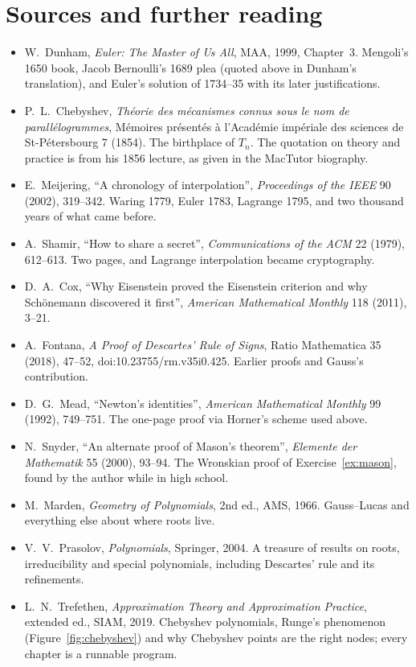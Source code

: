 \section*{Sources and further reading}

\begin{itemize}\raggedright
\item W.~Dunham, \emph{Euler: The Master of Us All}, MAA, 1999, Chapter~3. Mengoli's 1650 book, Jacob Bernoulli's 1689 plea (quoted above in Dunham's translation), and Euler's solution of 1734--35 with its later justifications.
\item P.~L.~Chebyshev, \emph{Th\'eorie des m\'ecanismes connus sous le nom de parall\'elogrammes}, M\'emoires pr\'esent\'es \`a l'Acad\'emie imp\'eriale des sciences de St-P\'etersbourg 7 (1854). The birthplace of $T_n$. The quotation on theory and practice is from his 1856 lecture, as given in the MacTutor biography.
\item E.~Meijering, ``A chronology of interpolation'', \emph{Proceedings of the IEEE} 90 (2002), 319--342. Waring 1779, Euler 1783, Lagrange 1795, and two thousand years of what came before.
\item A.~Shamir, ``How to share a secret'', \emph{Communications of the ACM} 22 (1979), 612--613. Two pages, and Lagrange interpolation became cryptography.
\item D.~A.~Cox, ``Why Eisenstein proved the Eisenstein criterion and why Sch\"onemann discovered it first'', \emph{American Mathematical Monthly} 118 (2011), 3--21.
\item A.~Fontana, \emph{A Proof of Descartes' Rule of Signs}, Ratio Mathematica 35 (2018), 47--52, doi:10.23755/rm.v35i0.425. Earlier proofs and Gauss's contribution.
\item D.~G.~Mead, ``Newton's identities'', \emph{American Mathematical Monthly} 99 (1992), 749--751. The one-page proof via Horner's scheme used above.
\item N.~Snyder, ``An alternate proof of Mason's theorem'', \emph{Elemente der Mathematik} 55 (2000), 93--94. The Wronskian proof of Exercise~\ref{ex:mason}, found by the author while in high school.
\item M.~Marden, \emph{Geometry of Polynomials}, 2nd ed., AMS, 1966. Gauss--Lucas and everything else about where roots live.
\item V.~V.~Prasolov, \emph{Polynomials}, Springer, 2004. A treasure of results on roots, irreducibility and special polynomials, including Descartes' rule and its refinements.
\item L.~N.~Trefethen, \emph{Approximation Theory and Approximation Practice}, extended ed., SIAM, 2019. Chebyshev polynomials, Runge's phenomenon (Figure~\ref{fig:chebyshev}) and why Chebyshev points are the right nodes; every chapter is a runnable program.

\end{itemize}
